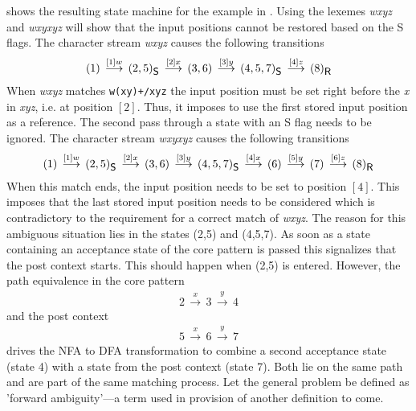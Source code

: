 \documentclass[acmtoplas]{acmtrans2m}
\begin{document}
 shows the resulting state machine for the example in 
. Using the lexemes {\it wxyz} and {\it wxyxyz} will
show that the input positions cannot be restored based on the {\sf S} flags.
The character stream {\it wxyz} causes the following transitions
\begin{eqnarray}
\label{eq:forward-ambiguous-1}
(1)                           \, \stackrel{[1]w}{\longrightarrow} \,
(2,5)_{\mbox{\sf \small S}}   \, \stackrel{[2]x}{\longrightarrow} \,
(3,6)                         \, \stackrel{[3]y}{\longrightarrow} \,
(4,5,7)_{\mbox{\sf \small S}} \, \stackrel{[4]z}{\longrightarrow} \,
(8)_{\mbox{\sf \small R}}
\end{eqnarray}
When {\it wxyz} matches {\tt w(xy)+/xyz} the input position must be set right
before the {\it x} in {\it xyz}, i.e. at position $[2]$. Thus, it imposes to
use the first stored input position as a reference. The second pass through
a state with an {\sf S} flag needs to be ignored. 
The character stream {\it wxyxyz} causes the following transitions
\begin{eqnarray}
\label{eq:forward-ambiguous-2}
(1)                           \, \stackrel{[1]w}{\longrightarrow} \,
(2,5)_{\mbox{\sf \small S}}   \, \stackrel{[2]x}{\longrightarrow} \,
(3,6)                         \, \stackrel{[3]y}{\longrightarrow} \,
(4,5,7)_{\mbox{\sf \small S}} \, \stackrel{[4]x}{\longrightarrow} \,
(6)                           \, \stackrel{[5]y}{\longrightarrow} \,
(7)                           \, \stackrel{[6]z}{\longrightarrow} \,
(8)_{\mbox{\sf \small R}}
\end{eqnarray}
When this match ends, the input position needs to be set to position $[4]$.
This imposes that the last stored input position needs to be considered which
is contradictory to the requirement for a correct match of {\it wxyz}. The reason
for this ambiguous situation lies in the states (2,5) and (4,5,7). As soon 
as a state containing an acceptance state of the core pattern is passed this
signalizes that the post context starts. This should happen when (2,5) is entered.
However, the path equivalence in the core pattern 
\begin{eqnarray}
\label{eq:ambiguous-iteration}
2    \, \stackrel{x}{\longrightarrow} \,
3    \, \stackrel{y}{\longrightarrow} \,
4    
\end{eqnarray}
and the post context
\begin{eqnarray}
\label{eq:ambiguous-iteration}
5    \, \stackrel{x}{\longrightarrow} \,
6    \, \stackrel{y}{\longrightarrow} \,
7    
\end{eqnarray}
drives the NFA to DFA transformation to combine a second acceptance state (state 4)
with a state from the post context (state 7). Both lie on the same path and are
part of the same matching process. Let the general problem
be defined as 'forward ambiguity'---a term used in provision of another
definition to come.
\end{document}
